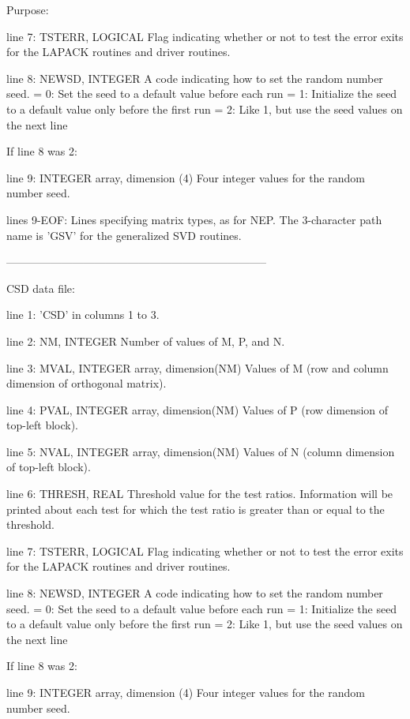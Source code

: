 \begin{DoxyParagraph}{Purpose\+: }
\begin{DoxyVerb}
 line 7:  TSTERR, LOGICAL
          Flag indicating whether or not to test the error exits for
          the LAPACK routines and driver routines.

 line 8:  NEWSD, INTEGER
          A code indicating how to set the random number seed.
          = 0:  Set the seed to a default value before each run
          = 1:  Initialize the seed to a default value only before the
                first run
          = 2:  Like 1, but use the seed values on the next line

 If line 8 was 2:

 line 9:  INTEGER array, dimension (4)
          Four integer values for the random number seed.

 lines 9-EOF:  Lines specifying matrix types, as for NEP.
          The 3-character path name is 'GSV' for the generalized
          SVD routines.

-----------------------------------------------------------------------

 CSD data file:

 line 1:  'CSD' in columns 1 to 3.

 line 2:  NM, INTEGER
          Number of values of M, P, and N.

 line 3:  MVAL, INTEGER array, dimension(NM)
          Values of M (row and column dimension of orthogonal matrix).

 line 4:  PVAL, INTEGER array, dimension(NM)
          Values of P (row dimension of top-left block).

 line 5:  NVAL, INTEGER array, dimension(NM)
          Values of N (column dimension of top-left block).

 line 6:  THRESH, REAL
          Threshold value for the test ratios.  Information will be
          printed about each test for which the test ratio is greater
          than or equal to the threshold.

 line 7:  TSTERR, LOGICAL
          Flag indicating whether or not to test the error exits for
          the LAPACK routines and driver routines.

 line 8:  NEWSD, INTEGER
          A code indicating how to set the random number seed.
          = 0:  Set the seed to a default value before each run
          = 1:  Initialize the seed to a default value only before the
                first run
          = 2:  Like 1, but use the seed values on the next line

 If line 8 was 2:

 line 9:  INTEGER array, dimension (4)
          Four integer values for the random number seed.


\end{DoxyVerb}
\end{DoxyParagraph}
